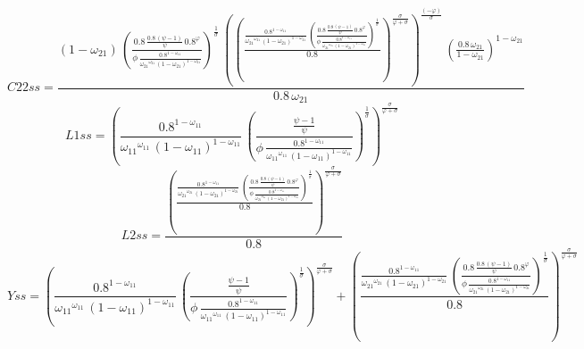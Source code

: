 \begin{dmath*}
C22ss = \frac{\left(1-{{\omega_{21}}}\right)\, \left(\frac{0.8\, \frac{0.8\, \left({{\psi}}-1\right)}{{{\psi}}}\, 0.8^{{{\varphi}}}}{{{\phi}}\, \frac{0.8^{1-{{\omega_{11}}}}}{{{\omega_{21}}}^{{{\omega_{21}}}}\, \left(1-{{\omega_{21}}}\right)^{1-{{\omega_{21}}}}}}\right)^{\frac{1}{{{\sigma}}}}\, \left(\left(\frac{\frac{0.8^{1-{{\omega_{11}}}}}{{{\omega_{21}}}^{{{\omega_{21}}}}\, \left(1-{{\omega_{21}}}\right)^{1-{{\omega_{21}}}}}\, \left(\frac{0.8\, \frac{0.8\, \left({{\psi}}-1\right)}{{{\psi}}}\, 0.8^{{{\varphi}}}}{{{\phi}}\, \frac{0.8^{1-{{\omega_{11}}}}}{{{\omega_{21}}}^{{{\omega_{21}}}}\, \left(1-{{\omega_{21}}}\right)^{1-{{\omega_{21}}}}}}\right)^{\frac{1}{{{\sigma}}}}}{0.8}\right)^{\frac{{{\sigma}}}{{{\varphi}}+{{\sigma}}}}\right)^{\frac{\left(-{{\varphi}}\right)}{{{\sigma}}}}\, \left(\frac{0.8\, {{\omega_{21}}}}{1-{{\omega_{21}}}}\right)^{1-{{\omega_{21}}}}}{0.8\, {{\omega_{21}}}}
\end{dmath*}
\begin{dmath*}
L1ss = \left(\frac{0.8^{1-{{\omega_{11}}}}}{{{\omega_{11}}}^{{{\omega_{11}}}}\, \left(1-{{\omega_{11}}}\right)^{1-{{\omega_{11}}}}}\, \left(\frac{\frac{{{\psi}}-1}{{{\psi}}}}{{{\phi}}\, \frac{0.8^{1-{{\omega_{11}}}}}{{{\omega_{11}}}^{{{\omega_{11}}}}\, \left(1-{{\omega_{11}}}\right)^{1-{{\omega_{11}}}}}}\right)^{\frac{1}{{{\sigma}}}}\right)^{\frac{{{\sigma}}}{{{\varphi}}+{{\sigma}}}}
\end{dmath*}
\begin{dmath*}
L2ss = \frac{\left(\frac{\frac{0.8^{1-{{\omega_{11}}}}}{{{\omega_{21}}}^{{{\omega_{21}}}}\, \left(1-{{\omega_{21}}}\right)^{1-{{\omega_{21}}}}}\, \left(\frac{0.8\, \frac{0.8\, \left({{\psi}}-1\right)}{{{\psi}}}\, 0.8^{{{\varphi}}}}{{{\phi}}\, \frac{0.8^{1-{{\omega_{11}}}}}{{{\omega_{21}}}^{{{\omega_{21}}}}\, \left(1-{{\omega_{21}}}\right)^{1-{{\omega_{21}}}}}}\right)^{\frac{1}{{{\sigma}}}}}{0.8}\right)^{\frac{{{\sigma}}}{{{\varphi}}+{{\sigma}}}}}{0.8}
\end{dmath*}
\begin{dmath*}
Yss = \left(\frac{0.8^{1-{{\omega_{11}}}}}{{{\omega_{11}}}^{{{\omega_{11}}}}\, \left(1-{{\omega_{11}}}\right)^{1-{{\omega_{11}}}}}\, \left(\frac{\frac{{{\psi}}-1}{{{\psi}}}}{{{\phi}}\, \frac{0.8^{1-{{\omega_{11}}}}}{{{\omega_{11}}}^{{{\omega_{11}}}}\, \left(1-{{\omega_{11}}}\right)^{1-{{\omega_{11}}}}}}\right)^{\frac{1}{{{\sigma}}}}\right)^{\frac{{{\sigma}}}{{{\varphi}}+{{\sigma}}}}+\left(\frac{\frac{0.8^{1-{{\omega_{11}}}}}{{{\omega_{21}}}^{{{\omega_{21}}}}\, \left(1-{{\omega_{21}}}\right)^{1-{{\omega_{21}}}}}\, \left(\frac{0.8\, \frac{0.8\, \left({{\psi}}-1\right)}{{{\psi}}}\, 0.8^{{{\varphi}}}}{{{\phi}}\, \frac{0.8^{1-{{\omega_{11}}}}}{{{\omega_{21}}}^{{{\omega_{21}}}}\, \left(1-{{\omega_{21}}}\right)^{1-{{\omega_{21}}}}}}\right)^{\frac{1}{{{\sigma}}}}}{0.8}\right)^{\frac{{{\sigma}}}{{{\varphi}}+{{\sigma}}}}
\end{dmath*}
